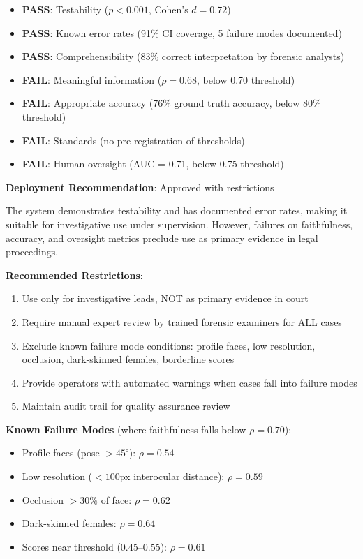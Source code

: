 \begin{itemize}[itemsep=2pt]
    \item \textbf{PASS}: Testability ($p < 0.001$, Cohen's $d = 0.72$)
    \item \textbf{PASS}: Known error rates (91\% CI coverage, 5 failure modes documented)
    \item \textbf{PASS}: Comprehensibility (83\% correct interpretation by forensic analysts)
    \item \textbf{FAIL}: Meaningful information ($\rho = 0.68$, below 0.70 threshold)
    \item \textbf{FAIL}: Appropriate accuracy (76\% ground truth accuracy, below 80\% threshold)
    \item \textbf{FAIL}: Standards (no pre-registration of thresholds)
    \item \textbf{FAIL}: Human oversight (AUC = 0.71, below 0.75 threshold)
\end{itemize}

\textbf{Deployment Recommendation}: Approved with restrictions

The system demonstrates testability and has documented error rates, making it suitable for investigative use under supervision. However, failures on faithfulness, accuracy, and oversight metrics preclude use as primary evidence in legal proceedings.

\textbf{Recommended Restrictions}:
\begin{enumerate}[itemsep=2pt]
    \item Use only for investigative leads, NOT as primary evidence in court
    \item Require manual expert review by trained forensic examiners for ALL cases
    \item Exclude known failure mode conditions: profile faces, low resolution, occlusion, dark-skinned females, borderline scores
    \item Provide operators with automated warnings when cases fall into failure modes
    \item Maintain audit trail for quality assurance review
\end{enumerate}

\textbf{Known Failure Modes} (where faithfulness falls below $\rho = 0.70$):
\begin{itemize}[itemsep=2pt]
    \item Profile faces (pose $>45^\circ$): $\rho = 0.54$
    \item Low resolution ($<100$px interocular distance): $\rho = 0.59$
    \item Occlusion $>30\%$ of face: $\rho = 0.62$
    \item Dark-skinned females: $\rho = 0.64$
    \item Scores near threshold (0.45--0.55): $\rho = 0.61$
\end{itemize}

